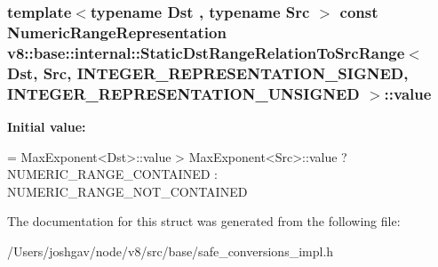 \subsubsection[{\texorpdfstring{value}{value}}]{\setlength{\rightskip}{0pt plus 5cm}template$<$typename Dst , typename Src $>$ const Numeric\+Range\+Representation {\bf v8\+::base\+::internal\+::\+Static\+Dst\+Range\+Relation\+To\+Src\+Range}$<$ Dst,                                                                                                                                                                                                                                                                                                           Src,                                                                                                                                                                                                                                                                                                           I\+N\+T\+E\+G\+E\+R\+\_\+\+R\+E\+P\+R\+E\+S\+E\+N\+T\+A\+T\+I\+O\+N\+\_\+\+S\+I\+G\+N\+ED,                                                                                                                                                                                                                                                                                                           I\+N\+T\+E\+G\+E\+R\+\_\+\+R\+E\+P\+R\+E\+S\+E\+N\+T\+A\+T\+I\+O\+N\+\_\+\+U\+N\+S\+I\+G\+N\+ED $>$\+::value\hspace{0.3cm}{\ttfamily [static]}}\hypertarget{structv8_1_1base_1_1internal_1_1_static_dst_range_relation_to_src_range_3_01_dst_00_01_01_01_01_ba4ef445538d07d627d3d2df8102baa7_aeced9b375afb6de290f05171a0203f1f}{}\label{structv8_1_1base_1_1internal_1_1_static_dst_range_relation_to_src_range_3_01_dst_00_01_01_01_01_ba4ef445538d07d627d3d2df8102baa7_aeced9b375afb6de290f05171a0203f1f}
{\bfseries Initial value\+:}
\begin{DoxyCode}
=
      MaxExponent<Dst>::value > MaxExponent<Src>::value
          ? NUMERIC\_RANGE\_CONTAINED
          : NUMERIC\_RANGE\_NOT\_CONTAINED
\end{DoxyCode}


The documentation for this struct was generated from the following file\+:\begin{DoxyCompactItemize}
\item 
/\+Users/joshgav/node/v8/src/base/safe\+\_\+conversions\+\_\+impl.\+h\end{DoxyCompactItemize}
